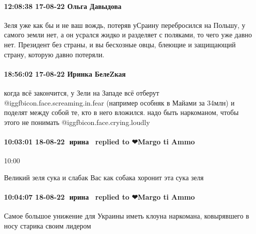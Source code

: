 \paragraph{12:08:38 17-08-22 Ольга Давыдова}

Зеля уже как бы и не ваш вождь, потеряв уСраину перебросился на Польшу, у
самого земли нет, а он усрался жидко и разделяет с поляками, то чего уже давно
нет. Президент без страны, и вы бесхозные овцы, блеющие и защищающий страну,
которую давно потеряли.

\paragraph{18:56:02 17-08-22 Иринка БелеZкая}

когда всё закончится, у Зели на Западе всё отберут  @igg{fbicon.face.screaming.in.fear} (например особняк в Майами
за 34млн) и поделят между собой те, кто в него вложился. надо быть наркоманом,
чтобы этого не понимать  @igg{fbicon.face.crying.loudly} 

\paragraph{10:03:01 18-08-22 🍏ирина 🍇🍇replied to ❤Margo ti Ammo}
10:00

Великий зеля сука и слабак
Вас как собака хоронит эта сука зеля

\paragraph{10:04:07 18-08-22 🍏ирина 🍇🍇replied to ❤Margo ti Ammo}

Самое большое унижение для Украины иметь клоуна наркомана, ковырявшего в носу
старика своим лидером

